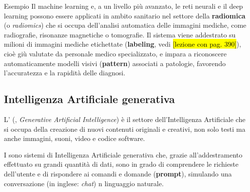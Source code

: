 \documentclass[
    notheorems,
    11pt,
    compress,
    aspectratio=169
]{beamer}
\begin{document}
\begin{frame}

    \begin{block}{Esempio}
        Il machine learning e, a un livello più avanzato, le reti neurali e il deep learning possono essere applicati in ambito sanitario nel settore della \textbf{radiomica} (o \textit{radiomics}) che si occupa dell'analisi automatica delle immagini mediche, come radiografie, risonanze magnetiche o tomografie. Il sistema viene addestrato su milioni di immagini mediche etichettate (\textbf{labeling}, vedi \hl{[lezione con pag. 390]}), cioè giù valutate da personale medico specializzato, e impara a riconoscere automaticamente modelli visivi (\textbf{pattern}) associati a patologie, favorendo l'accuratezza e la rapidità delle diagnosi.
    \end{block}
\end{frame}


\subsection{Intelligenza Artificiale generativa}

\begin{frame}

    L'\textbf{} (\textbf{}, \textit{Generative Artificial Intelligence}) è il settore dell'Intelligenza Artificiale che si occupa della creazione di nuovi contenuti originali e creativi, non solo testi ma anche immagini, suoni, video e codice software.

    \vspace{\baselineskip}

    I \textbf{} sono sistemi di Intelligenza Artificiale generativa che, grazie all'addestramento effettuato su grandi quantità di dati, sono in grado di comprendere le richieste dell'utente e di rispondere ai comandi e domande (\textbf{prompt}), simulando una conversazione (in inglese: \textit{chat}) n linguaggio naturale.
\end{frame}
\end{document}
